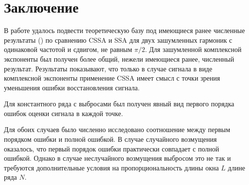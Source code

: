 \documentclass{spisok-article}
\begin{document}
\section{Заключение}
\label{sec:conclusions}

В работе удалось подвести теоретическую базу под имеющиеся ранее численные результаты (\cite{Golyandina.etal2013}) по сравнению CSSA и SSA для двух зашумленных гармоник с одинаковой частотой и сдвигом, не равным $\pi/2$. Для зашумленной комплексной экспоненты был получен более общий, нежели имеющиеся ранее, численный результат.
Результаты показывают, что только в случае сигнала в виде комплексной экспоненты применение CSSA имеет смысл с точки зрения уменьшения ошибки восстановления сигнала.

Для константного ряда с выбросами был получен явный вид первого порядка ошибок оценки сигнала в каждой точке.

Для обоих случаев было численно исследовано соотношение между первым порядком ошибки и полной ошибкой.
В случае случайного возмущения оказалось, что первый порядок ошибки практически совпадает с полной ошибкой. Однако в случае неслучайного возмущения выбросом это не так и требуются дополнительные условия на пропорциональность длины окна $L$ длине ряда $N$.

\renewcommand\refname{Литература}
\end{document}
